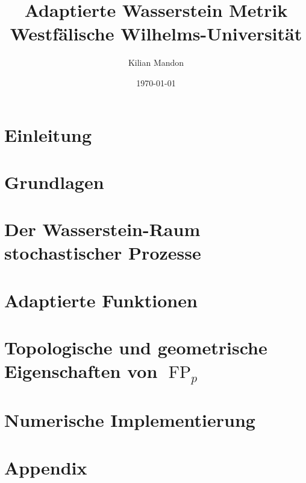\documentclass[12pt]{article}
\theoremstyle{definition}
\DeclareMathOperator{\FP}{FP}
\begin{document}
\title{
    {Adaptierte Wasserstein Metrik} \\
    {Westfälische Wilhelms-Universität}
}

\author{Kilian Mandon}
\date{\today}

\maketitle

\section{Einleitung}


\section{Grundlagen}


\section{Der Wasserstein-Raum stochastischer Prozesse}


\section{Adaptierte Funktionen}


\section{Topologische und geometrische Eigenschaften von \texorpdfstring{$\FP_p$}{FPp}}


\section{Numerische Implementierung}


\section{Appendix}

\end{document}
